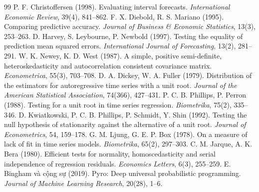 \documentclass[11pt,a4paper]{article}
\renewcommand{\_}{\gachduoi\allowbreak}
\begin{document}
\begin{thebibliography}{99}
 P. F. Christoffersen (1998). Evaluating interval forecasts. \emph{International Economic Review}, 39(4), 841--862.
 F. X. Diebold, R. S. Mariano (1995). Comparing predictive accuracy. \emph{Journal of Business \& Economic Statistics}, 13(3), 253--263.
 D. Harvey, S. Leybourne, P. Newbold (1997). Testing the equality of prediction mean squared errors. \emph{International Journal of Forecasting}, 13(2), 281--291.
 W. K. Newey, K. D. West (1987). A simple, positive semi-definite, heteroskedasticity and autocorrelation consistent covariance matrix. \emph{Econometrica}, 55(3), 703--708.
 D. A. Dickey, W. A. Fuller (1979). Distribution of the estimators for autoregressive time series with a unit root. \emph{Journal of the American Statistical Association}, 74(366), 427--431.
 P. C. B. Phillips, P. Perron (1988). Testing for a unit root in time series regression. \emph{Biometrika}, 75(2), 335--346.
 D. Kwiatkowski, P. C. B. Phillips, P. Schmidt, Y. Shin (1992). Testing the null hypothesis of stationarity against the alternative of a unit root. \emph{Journal of Econometrics}, 54, 159--178.
 G. M. Ljung, G. E. P. Box (1978). On a measure of lack of fit in time series models. \emph{Biometrika}, 65(2), 297--303.
 C. M. Jarque, A. K. Bera (1980). Efficient tests for normality, homoscedasticity and serial independence of regression residuals. \emph{Economics Letters}, 6(3), 255--259.
 E. Bingham và cộng sự (2019). Pyro: Deep universal probabilistic programming. \emph{Journal of Machine Learning Research}, 20(28), 1--6.
\end{thebibliography}
\end{document}
